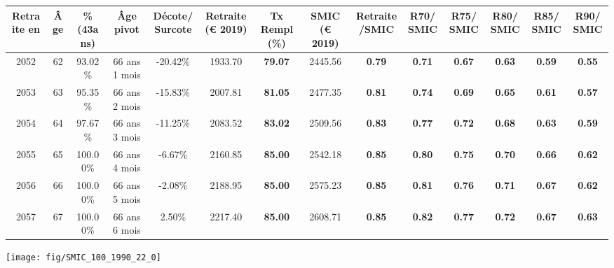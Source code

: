 \begin{adjustbox}{max width=\textwidth} 
\begin{tabular}[htb]{|c|c||c|c|c||c|c||c|c||c|c|c|c|c|} 
\hline 
 Retraite en &  Âge &  \%(43ans) &  Âge pivot &  Décote/Surcote &  Retraite (\euro{} 2019) &  Tx Rempl(\%) &  SMIC (\euro{} 2019) &  Retraite/SMIC &  R70/SMIC &  R75/SMIC &  R80/SMIC &  R85/SMIC &  R90/SMIC \\ 
\hline \hline 
 2052 &  62 &  93.02\% &  66 ans 1 mois &  -20.42\% &  1933.70 &  {\bf 79.07} &  2445.56 &  {\bf {\color{red} 0.79}} &  {\bf {\color{red} 0.71}} &  {\bf {\color{red} 0.67}} &  {\bf {\color{red} 0.63}} &  {\bf {\color{red} 0.59}} &  {\bf {\color{red} 0.55}} \\ 
\hline 
 2053 &  63 &  95.35\% &  66 ans 2 mois &  -15.83\% &  2007.81 &  {\bf 81.05} &  2477.35 &  {\bf {\color{red} 0.81}} &  {\bf {\color{red} 0.74}} &  {\bf {\color{red} 0.69}} &  {\bf {\color{red} 0.65}} &  {\bf {\color{red} 0.61}} &  {\bf {\color{red} 0.57}} \\ 
\hline 
 2054 &  64 &  97.67\% &  66 ans 3 mois &  -11.25\% &  2083.52 &  {\bf 83.02} &  2509.56 &  {\bf {\color{red} 0.83}} &  {\bf {\color{red} 0.77}} &  {\bf {\color{red} 0.72}} &  {\bf {\color{red} 0.68}} &  {\bf {\color{red} 0.63}} &  {\bf {\color{red} 0.59}} \\ 
\hline 
 2055 &  65 &  100.00\% &  66 ans 4 mois &  -6.67\% &  2160.85 &  {\bf 85.00} &  2542.18 &  {\bf {\color{red} 0.85}} &  {\bf {\color{red} 0.80}} &  {\bf {\color{red} 0.75}} &  {\bf {\color{red} 0.70}} &  {\bf {\color{red} 0.66}} &  {\bf {\color{red} 0.62}} \\ 
\hline 
 2056 &  66 &  100.00\% &  66 ans 5 mois &  -2.08\% &  2188.95 &  {\bf 85.00} &  2575.23 &  {\bf {\color{red} 0.85}} &  {\bf {\color{red} 0.81}} &  {\bf {\color{red} 0.76}} &  {\bf {\color{red} 0.71}} &  {\bf {\color{red} 0.67}} &  {\bf {\color{red} 0.62}} \\ 
\hline 
 2057 &  67 &  100.00\% &  66 ans 6 mois &  2.50\% &  2217.40 &  {\bf 85.00} &  2608.71 &  {\bf {\color{red} 0.85}} &  {\bf {\color{red} 0.82}} &  {\bf {\color{red} 0.77}} &  {\bf {\color{red} 0.72}} &  {\bf {\color{red} 0.67}} &  {\bf {\color{red} 0.63}} \\ 
\hline 
\hline 
\end{tabular} 
\end{adjustbox} 
 
 \vspace{0.1cm} 

 {\hspace{-2.2cm}\texttt{[image: fig/SMIC\_100\_1990\_22\_0]}} 

